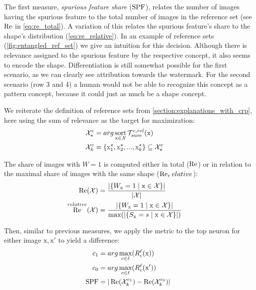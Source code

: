 The first measure, \textit{spurious feature share} ($\operatorname*{SPF}$), relates the number of images having the spurious feature to the total number of images in the reference set (see $\operatorname*{Re}$ in \cref{eq:re_total}). A variation of this relates the spurious feature's share to the shape's distribution (\cref{eq:re_relative}). In an example of reference sets (\cref{fig:entangled_ref_set}) we give an intuition for this decision. Although there is relevance assigned to the spurious feature by the respective concept, it also seems to encode the shape. Differentiation is still somewhat possible for the first scenario, as we can clearly see attribution towards the watermark. For the second scenario (row 3 and 4) a human would not be able to recognize this concept as a pattern concept, because it could just as much be a shape concept. 

We reiterate the definition of reference sets from \cref{section:explanations_with_crp}, here using the sum of relevance as the target for maximization: 
\begin{align}\displaystyle
\mathcal{X}_{\star}^{c} &= arg \operatorname*{sort}_{\mathrm{x} \in \mathcal{X}} \mathcal{T}_{sum}^{c,rel}(\mathrm{x}) & 
\notag \\
\mathcal{X}_{k}^{c} &= \{ \mathrm{x}_{1}^{\star},\mathrm{x}_{2}^{\star},..., \mathrm{x}_{k}^{\star} \} \subseteq \mathcal{X}_{\star}^{c} & \notag 
\end{align}

The share of images with $W=1$ is computed either in total ($\operatorname*{Re}$) or in relation to the maximal share of images with the same shape ($\operatorname*{Re}_relative$):
\begin{align}\displaystyle
\operatorname*{Re}(\mathcal{X}) &= \frac{ |\{W_{\mathrm{x}} = 1 \mid \mathrm{x} \in \mathcal{X} \}|   }
{|\mathcal{X}|}  & \label{eq:re_total} \\
\operatorname*{Re}^{relative}(\mathcal{X}) &= \frac{ |\{W_{\mathrm{x}} = 1 \mid \mathrm{x} \in \mathcal{X} \}|   }
{\max(|\{S_{\mathrm{x}} = s \mid \mathrm{x} \in \mathcal{X}\}|)}  &  \label{eq:re_relative}  
\end{align}

Then, similar to previous measures, we apply the metric to the top neuron for either image $\mathrm{x, x'}$ to yield a difference:
\begin{align}\displaystyle
c_1 &= arg\max_{c \in \ell} (R_c^{\ell}(\mathrm{x}) ) \\  
c_0 &= arg\max_{c \in \ell} (R_c^{\ell}(\mathrm{x'})) \notag\\
\operatorname*{SPF} &= |\operatorname*{Re}(\mathcal{X}_k^{c_1}) - \operatorname*{Re}(\mathcal{X}_k^{c_0})|
\end{align}

